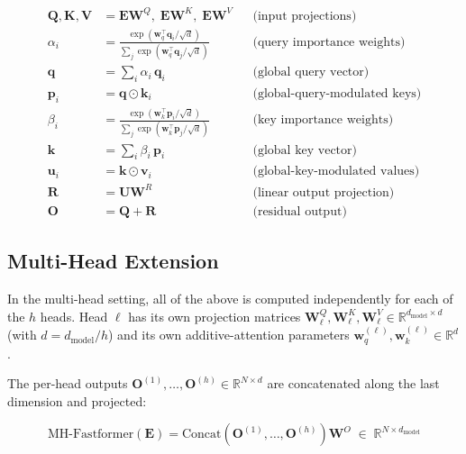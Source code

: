\documentclass[11pt,a4paper]{article}
\newcommand{\mat}[1]{\mathbf{#1}}
\newcommand{\vect}[1]{\mathbf{#1}}
\newcommand{\R}{\mathbb{R}}
\newcommand{\odotop}{\odot}
\theoremstyle{definition}
\begin{document}
\begin{align*}
  \mat{Q},\mat{K},\mat{V} &= \mat{E}\mat{W}^{Q},\;\mat{E}\mat{W}^{K},\;\mat{E}\mat{W}^{V}
  && \text{(input projections)} \\[4pt]
  \alpha_i &= \frac{\exp(\vect{w}_{q}^{\top}\vect{q}_i/\sqrt{d})}
                   {\sum_j\exp(\vect{w}_{q}^{\top}\vect{q}_j/\sqrt{d})}
  && \text{(query importance weights)} \\[4pt]
  \vect{q} &= \textstyle\sum_i \alpha_i\,\vect{q}_i
  && \text{(global query vector)} \\[4pt]
  \vect{p}_i &= \vect{q}\odotop\vect{k}_i
  && \text{(global-query-modulated keys)} \\[4pt]
  \beta_i &= \frac{\exp(\vect{w}_{k}^{\top}\vect{p}_i/\sqrt{d})}
                  {\sum_j\exp(\vect{w}_{k}^{\top}\vect{p}_j/\sqrt{d})}
  && \text{(key importance weights)} \\[4pt]
  \vect{k} &= \textstyle\sum_i \beta_i\,\vect{p}_i
  && \text{(global key vector)} \\[4pt]
  \vect{u}_i &= \vect{k}\odotop\vect{v}_i
  && \text{(global-key-modulated values)} \\[4pt]
  \mat{R}  &= \mat{U}\mat{W}^{R}
  && \text{(linear output projection)} \\[4pt]
  \mat{O}  &= \mat{Q}+\mat{R}
  && \text{(residual output)} 
\end{align*}

\subsection{Multi-Head Extension}
\label{sec:multihead}

In the multi-head setting, all of the above is computed independently for each of the $h$
heads.
Head $\ell$ has its own projection matrices $\mat{W}^{Q}_{\ell},\mat{W}^{K}_{\ell},
\mat{W}^{V}_{\ell}\in\R^{d_{\text{model}}\times d}$ (with $d=d_{\text{model}}/h$) and its
own additive-attention parameters $\vect{w}_{q}^{(\ell)},\vect{w}_{k}^{(\ell)}\in\R^{d}$.

The per-head outputs $\mat{O}^{(1)},\ldots,\mat{O}^{(h)}\in\R^{N\times d}$ are concatenated
along the last dimension and projected:

\begin{equation}
  \text{MH-Fastformer}(\mat{E}) =
  \text{Concat}\!\left(\mat{O}^{(1)},\ldots,\mat{O}^{(h)}\right)\mat{W}^{O}
  \;\in\;\R^{N\times d_{\text{model}}}
\end{equation}
\end{document}
